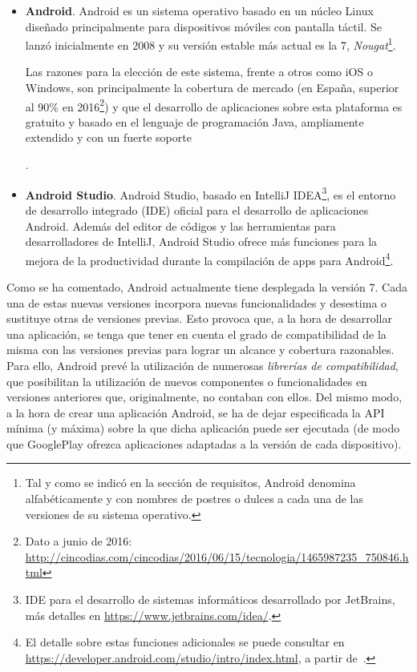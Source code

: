 \begin{itemize}
	\item{\textbf{Android}. Android es un sistema operativo basado en un núcleo Linux diseñado principalmente para dispositivos móviles con pantalla táctil. Se lanzó inicialmente en 2008 y su versión estable más actual es la 7, \textit{Nougat}\footnote{Tal y como se indicó en la sección de requisitos, Android denomina alfabéticamente y con nombres de postres o dulces a cada una de las versiones de su sistema operativo.}.
	
	Las razones para la elección de este sistema, frente a otros como iOS o Windows, son principalmente la cobertura de mercado (en España, superior al 90\% en 2016\footnote{Dato a junio de 2016: \url{http://cincodias.com/cincodias/2016/06/15/tecnologia/1465987235_750846.html}}) y que el desarrollo de aplicaciones sobre esta plataforma es gratuito y basado en el lenguaje de programación Java, ampliamente extendido y con un fuerte soporte}.
	
	\item{\textbf{Android Studio}. Android Studio, basado en IntelliJ IDEA\footnote{IDE para el desarrollo de sistemas informáticos desarrollado por JetBrains, más detalles en \url{https://www.jetbrains.com/idea/}.}, es el entorno de desarrollo integrado (IDE) oficial para el desarrollo de aplicaciones Android. Además del editor de códigos y las herramientas para desarrolladores de IntelliJ, Android Studio ofrece más funciones para la mejora de la productividad durante la compilación de apps para Android\footnote{El detalle sobre estas funciones adicionales se puede consultar en \url{https://developer.android.com/studio/intro/index.html}, a partir de~\cite{AnDev}.}}.
\end{itemize}

Como se ha comentado, Android actualmente tiene desplegada la versión 7. Cada una de estas nuevas versiones incorpora nuevas funcionalidades y desestima o sustituye otras de versiones previas. Esto provoca que, a la hora de desarrollar una aplicación, se tenga que tener en cuenta el grado de compatibilidad de la misma con las versiones previas para lograr un alcance y cobertura razonables. Para ello, Android prevé la utilización de numerosas \emph{librerías de compatibilidad}, que posibilitan la utilización de nuevos componentes o funcionalidades en versiones anteriores que, originalmente, no contaban con ellos. Del mismo modo, a la hora de crear una aplicación Android, se ha de dejar especificada la API mínima (y máxima) sobre la que dicha aplicación puede ser ejecutada (de modo que GooglePlay ofrezca aplicaciones adaptadas a la versión de cada dispositivo).

